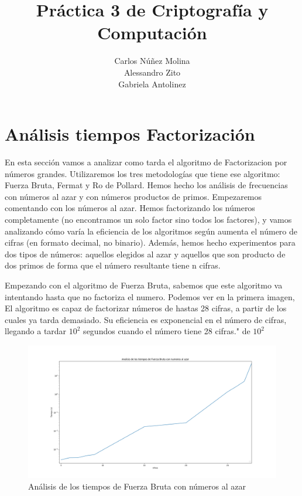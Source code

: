 \documentclass{article}
\title{Práctica 3 de Criptografía y Computación}
\date{}
\author{Carlos Núñez Molina \\ Alessandro Zito \\ Gabriela Antolinez}
\begin{document}
	\maketitle
	\newpage





    \section{Análisis tiempos Factorización}

    En esta sección vamos a analizar como tarda el algoritmo de Factorizacion por números grandes. Utilizaremos los tres metodologías que tiene ese algoritmo: Fuerza Bruta, Fermat y Ro de Pollard. Hemos hecho los análisis de frecuencias con números al azar y con números productos de primos. Empezaremos comentando con los números al azar. Hemos factorizando los números completamente (no encontramos un solo factor sino todos los factores), y vamos analizando cómo varía la eficiencia de los algoritmos según aumenta el número de cifras (en formato decimal, no binario). Además, hemos hecho experimentos para dos tipos de números: aquellos elegidos al azar y aquellos que son producto de dos primos de forma que el número resultante tiene n cifras.


    Empezando con el algoritmo de Fuerza Bruta, sabemos que este algoritmo va intentando hasta que no factoriza el numero. Podemos ver en la primera imagen, El algoritmo es capaz de factorizar números de hastas 28 cifras, a partir de los cuales ya tarda demasiado. Su eficiencia es exponencial en el número de cifras, llegando a tardar \begin{math} 10^{2} \end{math} segundos cuando el número tiene 28 cifras." de \begin{math} 10^{2} \end{math}



    \begin{figure}[ht!]
        \centering
        \includegraphics[scale=0.3]{Figure_1}
        \caption{Análisis de los tiempos de Fuerza Bruta con números al azar}
        \label{fig:Figure_1}
    \end{figure}
\end{document}
